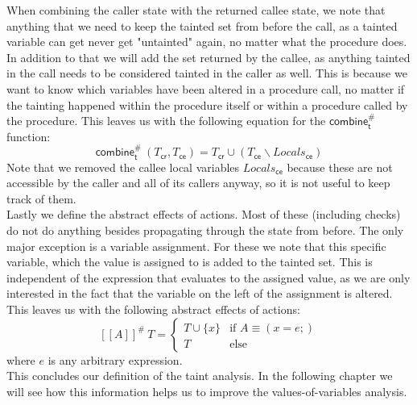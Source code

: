       When combining the caller state with the returned callee state, we note that anything that we need to keep the tainted set from before the call, as a tainted variable can get never get "untainted" again, no matter what the procedure does. In addition to that we will add the set returned by the callee, as anything tainted in the call needs to be considered tainted in the caller as well. This is because we want to know which variables have been altered in a procedure call, no matter if the tainting happened within the procedure itself or within a procedure called by the procedure. This leaves us with the following equation for the $\textsf{combine}^{\#}_\textsf{t}$ function:
      \[ \textsf{combine}^{\#}_\textsf{t}\ (T_\textsf{cr}, T_\textsf{ce}) = T_\textsf{cr} \cup (T_\textsf{ce} \backslash Locals_\textsf{ce}) \]
      Note that we removed the callee local variables $Locals_\textsf{ce}$ because these are not accessible by the caller and all of its callers anyway, so it is not useful to keep track of them.\\
      Lastly we define the abstract effects of actions. Most of these (including checks) do not do anything besides propagating through the state from before. The only major exception is a variable assignment. For these we note that this specific variable, which the value is assigned to is added to the tainted set. This is independent of the expression that evaluates to the assigned value, as we are only interested in the fact that the variable on the left of the assignment is altered. This leaves us with the following abstract effects of actions:
      \[ [\![ A ]\!] ^{\#}\ T = \left\{ \begin{array}{lcr}
        T \cup \{x\} & \text{if }A \equiv (x = e;)\\
        T & \text{else}
      \end{array} \right.   \]
      where $e$ is any arbitrary expression.\\
      This concludes our definition of the taint analysis. In the following chapter we will see how this information helps us to improve the values-of-variables analysis.

